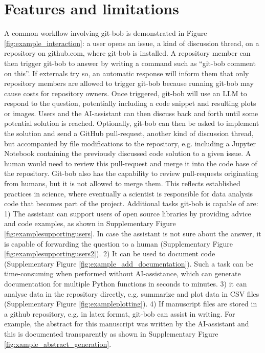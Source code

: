 \documentclass[times, twoside]{zHenriquesLab-StyleBioRxiv}
\begin{document}

\section*{Features and limitations} 

A common workflow involving git-bob is demonstrated in Figure \ref{fig:example_interaction}: a user opens an issue, a kind of discussion thread, on a repository on github.com, where git-bob is installed. A repository member can then trigger git-bob to answer by writing a command such as ``git-bob comment on this''. If externals try so, an automatic response will inform them that only repository members are allowed to trigger git-bob because running git-bob may cause costs for repository owners. Once triggered, git-bob will use an LLM to respond to the question, potentially including a code snippet and resulting plots or images. Users and the AI-assistant can then discuss back and forth until some potential solution is reached. Optionally, git-bob can then be asked to implement the solution and send a GitHub pull-request, another kind of discussion thread, but accompanied by file modifications to the repository, e.g. including a Jupyter Notebook containing the previously discussed code solution to a given issue. A human would need to review this pull-request and merge it into the code base of the repository. Git-bob also has the capability to review pull-requests originating from humans, but it is not allowed to merge them. This reflects established practices in science, where eventually a scientist is responsible for data analysis code that becomes part of the project. Additional tasks git-bob is capable of are: 1) The assistant can support users of open source libraries by providing advice and code examples, as shown in Supplementary Figure \ref{fig:examplesupportingusers}. In case the assistant is not sure about the answer, it is capable of forwarding the question to a human (Supplementary Figure \ref{fig:examplesupportingusers2}). 2) It can be used to document code (Supplementary Figure \ref{fig:example_add_documentation}). Such a task can be time-consuming when performed without AI-assistance, which can generate documentation for multiple Python functions in seconds to minutes. 3) it can analyse data in the repository directly, e.g. summarize and plot data in CSV files (Supplementary Figure \ref{fig:exampleplotting}). 4) If manuscript files are stored in a github repository, e.g. in latex format, git-bob can assist in writing. For example, the abstract for this manuscript was written by the AI-assistant and this is documented transparently as shown in Supplementary Figure \ref{fig:xample_abstract_generation}.
\end{document}
